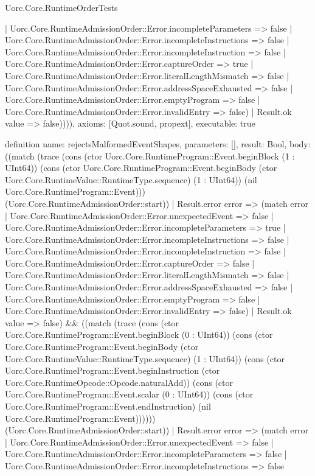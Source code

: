 \begin{lexlean}{Uorc.Core.RuntimeOrderTests}
\begin{semanticmodule}
{      | Uorc.Core.RuntimeAdmissionOrder::Error.incompleteParameters => false
      | Uorc.Core.RuntimeAdmissionOrder::Error.incompleteInstructions => false
      | Uorc.Core.RuntimeAdmissionOrder::Error.incompleteInstruction => false
      | Uorc.Core.RuntimeAdmissionOrder::Error.captureOrder => true
      | Uorc.Core.RuntimeAdmissionOrder::Error.literalLengthMismatch => false
      | Uorc.Core.RuntimeAdmissionOrder::Error.addressSpaceExhausted => false
      | Uorc.Core.RuntimeAdmissionOrder::Error.emptyProgram => false
      | Uorc.Core.RuntimeAdmissionOrder::Error.invalidEntry => false)
    | Result.ok value => false)))),
  axioms: [Quot.sound, propext],
  executable: true
}

definition{
  name: rejectsMalformedEventShapes,
  parameters: [],
  result: Bool,
  body: ((match (trace (cons (ctor Uorc.Core.RuntimeProgram::Event.beginBlock (1 : UInt64)) (cons (ctor Uorc.Core.RuntimeProgram::Event.beginBody (ctor Uorc.Core.RuntimeValue::RuntimeType.sequence) (1 : UInt64)) (nil Uorc.Core.RuntimeProgram::Event))) (Uorc.Core.RuntimeAdmissionOrder::start))
    | Result.error error => (match error
      | Uorc.Core.RuntimeAdmissionOrder::Error.unexpectedEvent => false
      | Uorc.Core.RuntimeAdmissionOrder::Error.incompleteParameters => true
      | Uorc.Core.RuntimeAdmissionOrder::Error.incompleteInstructions => false
      | Uorc.Core.RuntimeAdmissionOrder::Error.incompleteInstruction => false
      | Uorc.Core.RuntimeAdmissionOrder::Error.captureOrder => false
      | Uorc.Core.RuntimeAdmissionOrder::Error.literalLengthMismatch => false
      | Uorc.Core.RuntimeAdmissionOrder::Error.addressSpaceExhausted => false
      | Uorc.Core.RuntimeAdmissionOrder::Error.emptyProgram => false
      | Uorc.Core.RuntimeAdmissionOrder::Error.invalidEntry => false)
    | Result.ok value => false) && ((match (trace (cons (ctor Uorc.Core.RuntimeProgram::Event.beginBlock (0 : UInt64)) (cons (ctor Uorc.Core.RuntimeProgram::Event.beginBody (ctor Uorc.Core.RuntimeValue::RuntimeType.sequence) (1 : UInt64)) (cons (ctor Uorc.Core.RuntimeProgram::Event.beginInstruction (ctor Uorc.Core.RuntimeOpcode::Opcode.naturalAdd)) (cons (ctor Uorc.Core.RuntimeProgram::Event.scalar (0 : UInt64)) (cons (ctor Uorc.Core.RuntimeProgram::Event.endInstruction) (nil Uorc.Core.RuntimeProgram::Event)))))) (Uorc.Core.RuntimeAdmissionOrder::start))
    | Result.error error => (match error
      | Uorc.Core.RuntimeAdmissionOrder::Error.unexpectedEvent => false
      | Uorc.Core.RuntimeAdmissionOrder::Error.incompleteParameters => false
      | Uorc.Core.RuntimeAdmissionOrder::Error.incompleteInstructions => false
}
\end{semanticmodule}
\end{lexlean}
